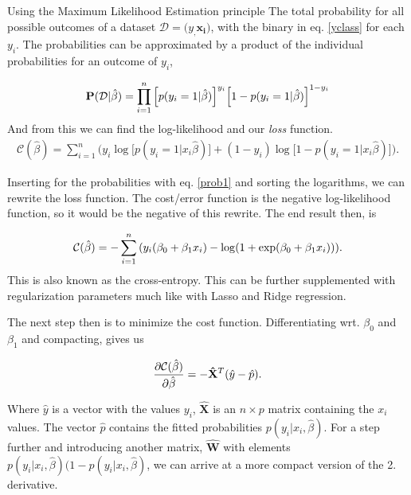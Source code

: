 \documentclass[10pt]{article}
\begin{document}
Using the Maximum Likelihood Estimation %
principle The total probability for all possible outcomes of a dataset
$\mathcal{D} = {(y_, \mathbf{x_i)}}$, with the binary in eq. \ref{yclass} for
each $y_i$. The probabilities can be approximated by a product of the
individual probabilities for an outcome of $y_i$,

\begin{align}
	\mathbf{P}(\mathcal{D}|\hat{\beta}) 
		= \prod_{i=1}^n\qty[p(y_i=1|\hat{\beta})]^{y_i}
			\qty[ 1 - p(y_i=1|\hat{\beta}) ]^{1-y_i}
\end{align}
And from this we can find the log-likelihood and our \emph{loss} function. 
\begin{align}
	\mathcal{C}(\hat{\beta}) = 
		\sum_{i=1}^n \bigg( 
			y_i \log\big[p(y_i=1|x_i\hat{\beta})\big] + 
			(1 - y_i)\log\big[ 1 - p(y_i=1|x_i\hat{\beta})\big]\bigg).
\end{align}

Inserting for the probabilities with eq. \ref{prob1} and sorting the logarithms, we can
rewrite the loss function. The cost/error function is the negative log-likelihood function, so it
would be the negative of this rewrite. The end result then, is

\begin{align}
	\mathcal{C}(\hat{\beta}) = 
		-\sum_{i=1}^n \qty(y_i(\beta_0 + \beta_1x_i) - \log(1 + \exp(\beta_0 + \beta_1x_i)))
		\label{costfunc}.
\end{align}
This is also known as the cross-entropy. This can be further supplemented with regularization
parameters much like with Lasso and Ridge regression. 

The next step then is to minimize the cost function. Differentiating wrt. $\beta_0$ and $\beta_1$
and compacting, gives us

\begin{align}
	\pdv{\mathcal{C}(\hat{\beta})}{\hat{\beta}} = 
		- \mathbf{\hat{X}}^T (\hat{y} - \hat{p}).
	\label{Cost1stDerivative}
\end{align}

Where $\hat{y}$ is a vector with the values $y_i$, $\mathbf{\hat{X}}$ is an
$n\times p$ matrix containing the $x_i$ values. The vector $\hat{p}$ contains
the fitted probabilities $p(y_i|x_i,\hat{\beta})$. For a step further and
introducing another matrix, $\mathbf{\hat{W}}$ with elements
$p(y_i|x_i,\hat{\beta})(1 - p(y_i|x_i,\hat{\beta})$, we can arrive at a more
compact version of the 2. derivative. 
\end{document}

